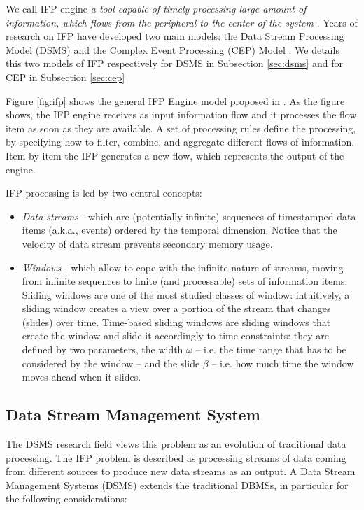 We call IFP engine \textit{a tool capable of timely processing large amount of information, which flows from the peripheral to the center of the system} \cite{Cugola:2012:PFI:2187671.2187677}. Years of research on IFP have developed two main models: the Data Stream Processing Model (DSMS) \cite{Babcock:2002:MID:543613.543615} and the Complex Event Processing (CEP) Model \cite{Luckham:2001:PEI:515781}. We details this two models of IFP respectively for DSMS in Subsection \ref{sec:dsms} and for CEP in Subsection \ref{sec:cep}

Figure \ref{fig:ifp} shows the general IFP Engine model proposed in \cite{Cugola:2012:PFI:2187671.2187677}. As the figure shows, the IFP engine receives as input information flow and it processes the flow item as soon as they are available. A set of processing rules define the processing, by specifying how to filter, combine, and aggregate different flows of information. Item by item the IFP generates a new flow, which represents the output of the engine.

IFP processing is led by two central concepts:
\begin{itemize}

\item \textit{Data streams} - which are (potentially infinite) sequences of timestamped data items (a.k.a., events) ordered by the temporal dimension. Notice that the velocity of data stream prevents secondary memory usage. 

\item \textit{Windows} - which allow to cope with the infinite nature of streams, moving from infinite sequences to finite (and processable) sets of information items. Sliding windows are one of the most studied classes of window: intuitively, a sliding window creates a view over a portion of the stream that changes (slides) over time. Time-based sliding windows are sliding windows that create the window and slide it accordingly to time constraints: they are defined by two parameters, the width $\omega$	 – i.e. the time range that has to be considered by the window – and the slide $\beta$ – i.e. how much time the window moves ahead when it slides.

\end{itemize}



\subsection*{Data Stream Management System}\label{sec:dsms}
The DSMS research field  views this problem as an evolution of traditional data processing. The IFP problem is described as processing streams of data coming from different sources to produce new data streams as an output. A Data Stream Management Systems (DSMS) extends the traditional DBMSs, in particular for the following considerations:

